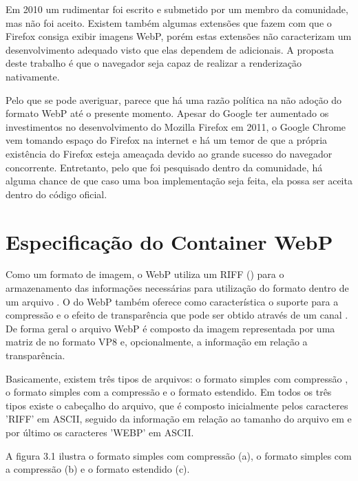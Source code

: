 \documentclass[espaco=simples,appendix=Name]{abnt}
\begin{document}
Em 2010 um  rudimentar foi escrito e submetido por um membro da comunidade, mas não foi aceito. Existem também algumas extensões que fazem com que o Firefox consiga exibir imagens WebP, porém estas extensões não caracterizam um desenvolvimento adequado visto que elas dependem de  adicionais. A proposta deste trabalho é que o navegador seja capaz de realizar a renderização nativamente.

Pelo que se pode averiguar, parece que há uma razão política na não adoção do formato WebP até o presente momento. Apesar do Google ter aumentado os investimentos no desenvolvimento do Mozilla Firefox em 2011, o Google Chrome vem tomando espaço do Firefox na internet e há um temor de que a própria existência do Firefox esteja ameaçada devido ao grande sucesso do navegador concorrente. Entretanto, pelo que foi pesquisado dentro da comunidade, há alguma chance de que caso uma boa implementação seja feita, ela possa ser aceita dentro do código oficial.

\section{Especificação do Container WebP}

Como um formato de imagem, o WebP utiliza um  RIFF () para o armazenamento das informações necessárias para utilização do formato dentro de um arquivo \cite{RIFFContainer}. O  do WebP também oferece como característica o suporte para a compressão  e o efeito de transparência que pode ser obtido através de um canal . De forma geral o arquivo WebP é composto da imagem representada por uma matriz de  no formato VP8 e, opcionalmente, a informação em relação a transparência.

Basicamente, existem três tipos de arquivos: o formato simples com compressão , o formato simples com a compressão  e o formato estendido. Em todos os três tipos existe o cabeçalho do arquivo, que é composto inicialmente pelos caracteres 'RIFF' em ASCII, seguido da informação em relação ao tamanho do arquivo em  e por último os caracteres 'WEBP' em ASCII.

\newpage

A figura 3.1 ilustra o formato simples com compressão  (a), o formato simples com a compressão  (b) e o formato estendido (c).
\end{document}
